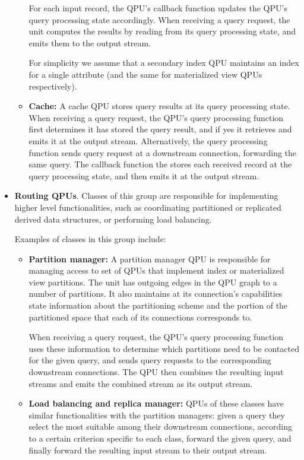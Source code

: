 \begin{itemize}
\begin{itemize}
    For each input record, the QPU's callback function updates the QPU's query processing state accordingly.
    When receiving a query request, the unit computes the results by reading from its query processing state,
    and emits them to the output stream.

    For simplicity we assume that a secondary index QPU maintains an index for a single attribute
    (and the same for materialized view QPUs respectively).

    \item \textbf{Cache:}
    A cache QPU stores query results at its query processing state.
    When receiving a query request, the QPU's query processing function first determines it has stored the query result,
    and if yes it retrieves and emits it at the output stream.
    Alternatively, the query processing function sends query request at a downstream connection, forwarding the same query.
    The callback function the stores each received record at the query processing state, and then emits it at the output
    stream.
    \end{itemize}

  \item \textbf{Routing QPUs}.
  Classes of this group are responsible for implementing higher level functionalities, such as coordinating partitioned or
  replicated derived data structures, or performing load balancing.

  Examples of classes in this group include:
  \begin{itemize}
    \item \textbf{Partition manager:}
    A partition manager QPU is responsible for managing access to set of QPUs that implement index or materialized view
    partitions.
    The unit has outgoing edges in the QPU graph to a number of partitions.
    It also maintains at its connection's capabilities state information about the partitioning scheme and the portion of
    the partitioned space that each of its connections corresponds to.

    When receiving a query request, the QPU's query processing function uses these information to determine which
    partitions need to be contacted for the given query,
    and sends query requests to the corresponding downstream connections.
    The QPU then combines the resulting input streams and emits the combined stream as its output stream.

    \item \textbf{Load balancing and replica manager:}
    QPUs of these classes have similar functionalities with the partition managers:
    given a query they select the most suitable among their downstream connections, according to a certain criterion specific
    to each class, forward the given query, and finally forward the resulting input stream to their output stream.


\end{itemize}
\end{itemize}
